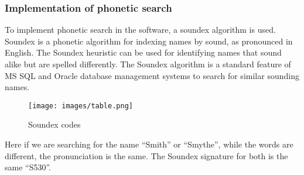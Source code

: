
\subsubsection{Implementation of phonetic search}
To implement phonetic search in the software, a soundex algorithm is used.
Soundex is a phonetic algorithm for indexing names by sound, as pronounced 
in English. The Soundex heuristic can be used for identifying names that 
sound alike but are spelled differently. The Soundex algorithm is a standard 
feature of MS SQL and Oracle database management systems to search for similar 
sounding names. 
\begin{figure}[h]
\centering \texttt{[image: images/table.png]}
\caption{Soundex codes}
\end{figure}

Here if we are searching for the name “Smith” or “Smythe”, while the words are
 different, the pronunciation is the same. The Soundex signature for both is the 
same “S530”.

